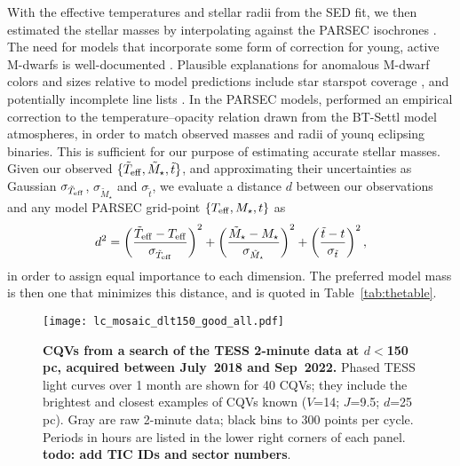 \documentclass[11pt,twocolumn,tighten]{aastex63}
\begin{document}
With the effective temperatures and stellar radii from the SED fit, we
then estimated the stellar masses by interpolating against the PARSEC
isochrones \citep[v1.2S][]{2014MNRAS.444.2525C}.  The need for models
that incorporate some form of correction for young, active M-dwarfs is
well-documented
\citep[e.g.][]{2012ApJ...756...47S,2015ApJ...804..146D,2016A&A...593A..99F,2020ApJ...891...29S}.
Plausible explanations for anomalous M-dwarf colors and sizes relative to
model predictions include star starspot coverage
\citep[e.g.][]{2017ApJ...836..200G}, and potentially incomplete line
lists \citep[e.g.][]{2013A&A...556A..15R}.  In the PARSEC models,
\citet{2014MNRAS.444.2525C} performed an empirical correction to the
temperature--opacity relation drawn from the BT-Settl model atmospheres,
in order to match observed masses and radii of younq eclipsing binaries.
This is sufficient for our purpose of estimating accurate stellar masses.
Given our observed $\{ \tilde{T}_{\rm eff}, \tilde{M}_\star, \tilde{t} \}$,
and approximating their uncertainties as Gaussian
$\sigma_{\tilde{T}_{\rm eff}}$, $\sigma_{\tilde{M}_\star}$ and
$\sigma_{\tilde{t}}$, we evaluate a distance $d$ between our observations
and any model PARSEC grid-point $\{ T_{\rm eff}, M_\star, t \}$ as
\begin{equation}
  d^2 = 
  \left( \frac{\tilde{T}_{\rm eff} - T_{\rm eff}}{\sigma_{\tilde{T}_{\rm eff}}} \right)^2
  +
  \left( \frac{\tilde{M}_{\star} - M_{\star}}{\sigma_{\tilde{M}_{\star}}} \right)^2
  +
  \left( \frac{\tilde{t} - t}{\sigma_{\tilde{t}}} \right)^2,
\end{equation}
in order to assign equal importance to each dimension.  The preferred
model mass is then one that minimizes this distance, and is quoted in
Table~\ref{tab:thetable}.


\begin{figure*}[!t]
	\begin{center}
		\centering
		\texttt{[image: lc\_mosaic\_dlt150\_good\_all.pdf]}
		\caption{
			{\bf CQVs from a search of the TESS 2-minute data at
				$d$$<$150\,pc, acquired between July~2018 and Sep~2022.}
			Phased TESS light curves over 1 month are shown for 40 CQVs;
			they include the brightest and closest examples of CQVs known
			($V$=14; $J$=9.5; $d$=25\,pc).  Gray are raw 2-minute data;
			black bins to 300 points per cycle.  Periods in hours are listed
			in the lower right corners of each panel.
			{\bf todo:  add TIC IDs and sector numbers}.
		}
		\label{fig:singlemosaic}
	\end{center}
\end{figure*}
\end{document}
